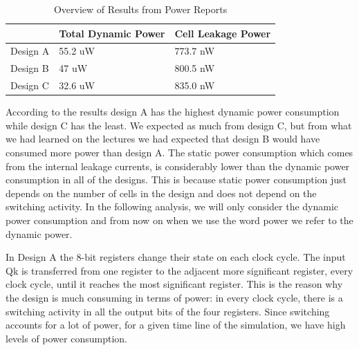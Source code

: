 \documentclass[11pt,a4paper]{article}
\begin{document}
\begin{table}[htbp]
\begin{center}
\begin{tabular}{|l|l|l|}
\hline
\textbf{}	& \textbf{Total Dynamic Power}		& \textbf{Cell Leakage Power}\\ \hline
Design A &	55.2 uW				& 773.7 nW \\ \hline
Design B &	47 uW					& 800.5 nW \\ \hline
Design C &  32.6 uW				& 835.0 nW \\ \hline
\end{tabular}
\end{center}
\caption{Overview of Results from Power Reports}
\label{table:power}
\end{table}

According to the results design A has the highest dynamic power consumption while design C has the least. We expected as much from design C, but from what we had learned on the lectures we had expected that design B would have consumed more power than design A. The static power consumption which comes from the internal leakage currents, is considerably lower than the dynamic power consumption in all of the designs. This is because static power consumption just depends on the number of cells in the design and does not depend on the switching activity. In the following analysis, we will only consider the dynamic power consumption and from now on when we use the word power we refer to the dynamic power.

In Design A the 8-bit registers change their state on each clock cycle. The input Qk is transferred from one register to the adjacent more significant register, every clock cycle, until it reaches the most significant register. This is the reason why the design is much consuming in terms of power: in every clock cycle, there is a switching activity in all the output bits of the four registers. Since switching accounts for a lot of power, for a given time line of the simulation, we have high levels of power consumption. 
\end{document}
